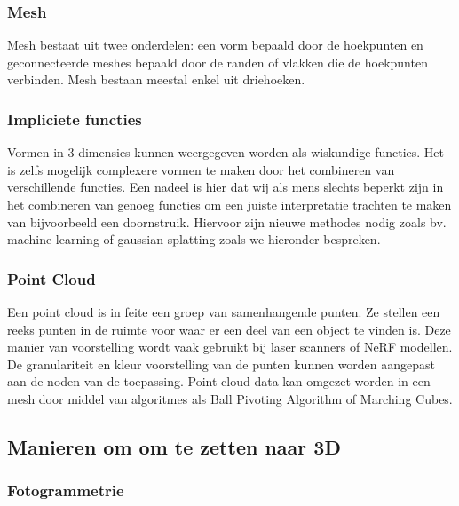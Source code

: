 \documentclass{hogent-article}
\begin{document}
\subsubsection{Mesh}

Mesh bestaat uit twee onderdelen: een vorm bepaald door de hoekpunten  en geconnecteerde meshes bepaald door de randen of vlakken die de hoekpunten verbinden. Mesh bestaan meestal enkel uit driehoeken. \autocite{Luebke2002} 

\subsubsection{Impliciete functies}

Vormen in 3 dimensies kunnen weergegeven worden als wiskundige functies. Het is zelfs mogelijk complexere vormen te maken door het combineren van verschillende functies. Een nadeel is hier dat wij als mens slechts beperkt zijn in het combineren van genoeg functies om een juiste interpretatie trachten te maken van bijvoorbeeld een doornstruik.  Hiervoor zijn nieuwe methodes nodig zoals bv.  machine learning  of gaussian splatting zoals we hieronder bespreken. \autocite{Tancik2023}

\subsubsection{Point Cloud}

Een point cloud is in feite een groep van samenhangende punten. Ze stellen een reeks punten in de ruimte voor waar er een deel van een object te vinden is. Deze manier van voorstelling wordt vaak gebruikt bij laser scanners of NeRF modellen. De granulariteit en kleur voorstelling van de punten kunnen worden aangepast aan de noden van de toepassing. 
Point cloud data kan omgezet worden in een mesh door middel van algoritmes als Ball Pivoting Algorithm of Marching Cubes. \autocite{Fisher2014}

\subsection{Manieren om om te zetten naar 3D}

\subsubsection{Fotogrammetrie}
\end{document}
